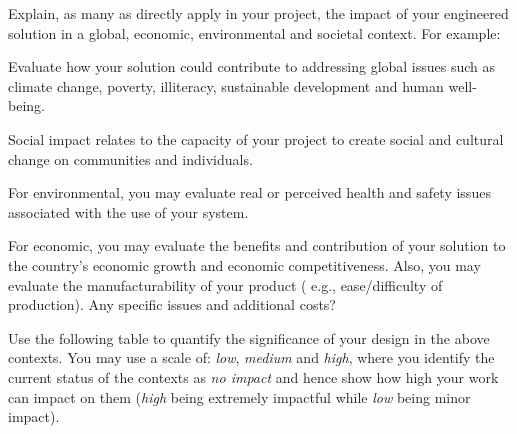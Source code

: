 \documentclass[../main.tex]{subfiles}
\begin{document}
\begin{newrequirements}
    \begin{todolist}
    \item [\done] Explain, as many as directly apply in 
        your project, the impact of your 
        engineered solution in a global, 
        economic, environmental and societal 
        context. For example: 

    \begin{todolist}
    \item [\done] Evaluate how your solution could 
        contribute to addressing global issues 
        such as climate change, poverty, 
        illiteracy, sustainable development and 
        human well-being. 

    \item [\done] Social impact relates to the capacity 
        of your project to create social and 
        cultural change on communities and 
        individuals. 

    \item [\done] For environmental, you may evaluate 
        real or perceived health and safety 
        issues associated with the use of your 
        system. 

    \item [\done] For economic, you may evaluate the 
        benefits and contribution of your 
        solution to the country’s economic 
        growth and economic competitiveness. 
        Also, you may evaluate the 
        manufacturability of your product (
        e.g., ease/difficulty of production). 
        Any specific issues and additional 
        costs? 
    \end{todolist}

    \item [\done] Use the following table to quantify the 
        significance of your design in the 
        above contexts. You may use a scale of: 
        \textit{low}, \textit{medium} and \textit{high}, 
        where you 
        identify the current status of the 
        contexts as \textit{no impact} and hence show 
        how high your work can impact on them
        (\textit{high} being extremely impactful while 
        \textit{low} being minor impact). 

    \end{todolist}
\end{newrequirements}

\setcounter{impactcounter}{1}
\newcommand\showimpactcounter{%
    \theimpactcounter\stepcounter{impactcounter}%
}
\end{document}
